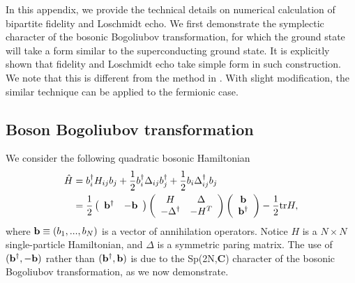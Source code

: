 
In this appendix, we provide the technical details on numerical calculation of bipartite fidelity and Loschmidt echo. We first demonstrate the symplectic character of the bosonic Bogoliubov transformation, for which the ground state will take a form similar to the superconducting ground state. It is explicitly shown that fidelity and Loschmidt echo take simple form in such construction. We note that this is different from the method in . With slight modification, the similar technique can be applied to the fermionic case. 

\subsection{Boson Bogoliubov transformation}
\label{app: Boson BdG}
We consider the following quadratic bosonic Hamiltonian
\begin{eqnarray}\begin{aligned}
\label{Quadratic boson H}
\hat{H}&=b_i^\dagger H_{ij}b_j+\frac{1}{2}b^\dagger_i\Delta_{ij}b_j^\dagger+\frac{1}{2}b_i\Delta^\dagger_{ij}b_j\\
&=\frac{1}{2}
\left(\begin{array}{ccc}
{\bf b}^\dagger & -{\bf b}
\end{array}\right)
\left(\begin{array}{ccc}
H & \Delta\\
-\Delta^\dagger & -H^T
\end{array}\right)
\left(\begin{array}{ccc}
{\bf b} \\
{\bf b}^\dagger
\end{array}\right)-\frac{1}{2}\text{tr}H,
\end{aligned}\end{eqnarray}
where ${\bf b}\equiv(b_{1},...,b_{N})$ is a vector of annihilation operators. Notice $H$ is a $N\times N$ single-particle Hamiltonian, and $\Delta$ is a symmetric paring matrix. The use of $({\bf b}^\dagger , -{\bf b})$ rather than $({\bf b}^\dagger , {\bf b})$ is due to the Sp(2N,{\bf C}) character of the bosonic Bogoliubov transformation, as we now demonstrate. 

